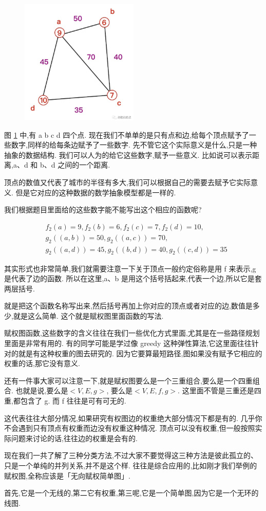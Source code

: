\begin{figure}[ht]
  \centering
  \includegraphics[width=0.5\textwidth]{asset/20231227145314.png}
  \caption{}
  \label{fig:img25_12}
\end{figure}

图 \ref{fig:img25_12} 中,有 a b c d 四个点. 现在我们不单单的是只有点和边,给每个顶点赋予了一些数字,同样的给每条边赋予了一些数字. 先不管它这个实际意义是什么,只是一种抽象的数据结构. 我们可以人为的给它这些数字,赋予一些意义. 比如说可以表示距离,a、d 和 b、d 之间的一个距离. 

顶点的数值又代表了城市的半径有多大,我们可以根据自己的需要去赋予它实际意义. 但是它对应的这种数据的数学抽象模型都是一样的. 

我们根据题目里面给的这些数字能不能写出这个相应的函数呢? 

\begin{align*}
  & f_2(a)=9, f_2(b)=6, f_2(c)=7, f_2(d)=10, \\ 
  & g_2((a,b))=50, g_2((a,c))=70, \\ 
  & g_2((a,d))=45, g_2((b,d))=40, g_2((c,d))=35
\end{align*}

其实形式也非常简单,我们就需要注意一下关于顶点一般约定俗称是用 f 来表示,g 是代表了边的函数. 所以在这里,a、b 是用这个括号括起来,代表一个边,所以它是套两层括号. 

就是把这个函数名称写出来,然后括号再加上你对应的顶点或者对应的边,数值是多少,就是这么简单. 这个就是赋权图里面函数的写法. 

赋权图函数,这些数字的含义往往在我们一些优化方式里面,尤其是在一些路径规划里面是非常有用的. 有的同学可能是学过像 greedy 这种弹性算法,它这里面往往针对的就是有这种权重的图去研究的. 因为它要算最短路径,图如果没有赋予它相应的权重的话,那它没有意义. 

还有一件事大家可以注意一下,就是赋权图要么是一个三重组合,要么是一个四重组合. 也就是说,要么是$<V,E,g>$, 要么是$<V,E,f,g>$. 这里面不管是三重还是四重,都包含了 g. 而 f 往往是可有可无的. 

这代表往往大部分情况,如果研究有权图边的权重绝大部分情况下都是有的. 几乎你不会遇到只有顶点有权重而边没有权重这种情况. 顶点可以没有权重,但一般按照实际问题来讨论的话,往往边的权重是会有的. 

现在我们一共了解了三种分类方法,不过大家不要觉得这三种方法是彼此孤立的、只是一个单纯的并列关系,并不是这个样. 往往是综合应用的,比如刚才我们举例的赋权图,全称应该是「无向赋权简单图」. 

首先,它是一个无线的,第二它有权重,第三呢,它是一个简单图,因为它是一个无环的线图. 